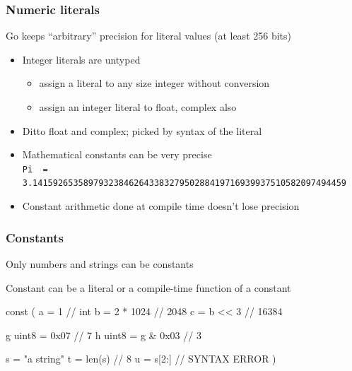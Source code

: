 \documentclass[handout,compress,t,11pt]{beamer}
\begin{document}
\begin{frame}[fragile]
    \frametitle{Numeric literals}
    Go keeps ``arbitrary'' precision for literal values (at least 256 bits)
    \begin{itemize}
        \item Integer literals are untyped \\
        \begin{itemize}
        \item assign a literal to any size integer without conversion \\
        \item assign an integer literal to float, complex also
        \end{itemize}
        \vspace{\baselineskip}
        \item Ditto float and complex; picked by syntax of the literal
        \vspace{\baselineskip}
        \item Mathematical constants can be very precise \\
        {\tiny\verb|Pi  = 3.14159265358979323846264338327950288419716939937510582097494459|} \par
        \vspace{\baselineskip}
        \item Constant arithmetic done at compile time doesn't lose precision
    \end{itemize}
\end{frame}

\begin{frame}[fragile]
    \frametitle{Constants}
    Only numbers and strings can be constants \par
    \vspace{0.5\baselineskip}
    Constant can be a literal or a compile-time function of a constant
\begin{golang}
    const (
        a = 1                 // int
        b = 2 * 1024          // 2048
        c = b << 3            // 16384

        g uint8 = 0x07        // 7
        h uint8 = g & 0x03    // 3

        s = "a string"
        t = len(s)            // 8
        u = s[2:]             // SYNTAX ERROR
    )
\end{golang}
\end{frame}
\end{document}
